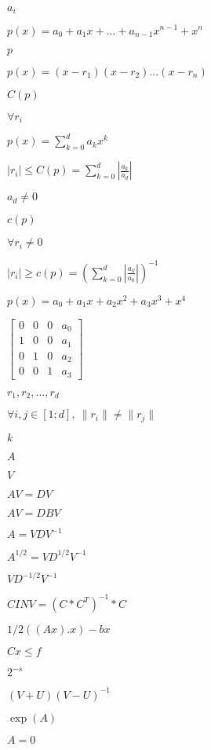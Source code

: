\documentclass{article}
\begin{document}
$ a_i $
\pagebreak

$ p(x) = a_0 + a_{1}x + ... + a_{n-1}x^{n-1} + x^n $
\pagebreak

$ p $
\pagebreak

$ p(x) = (x-r_1)(x-r_2)...(x-r_n) $
\pagebreak

$C(p)$
\pagebreak

$ \forall r_i $
\pagebreak

$ p(x) = \sum_{k=0}^d a_k x^k $
\pagebreak

$ |r_i| \le C(p) = \sum_{k=0}^{d} \left | \frac{a_k}{a_d} \right | $
\pagebreak

$a_d \neq 0$
\pagebreak

$c(p)$
\pagebreak

$ \forall r_i \neq 0 $
\pagebreak

$ |r_i| \ge c(p) = \left( \sum_{k=0}^{d} \left | \frac{a_k}{a_0} \right | \right)^{-1} $
\pagebreak

$ p(x) = a_0 + a_1 x + a_2 x^2 + a_{3} x^3 + x^4 $
\pagebreak

$ \left [ \begin{array}{cccc} 0 & 0 & 0 & a_0 \\ 1 & 0 & 0 & a_1 \\ 0 & 1 & 0 & a_2 \\ 0 & 0 & 1 & a_3 \end{array} \right ] $
\pagebreak

$r_1,r_2,...,r_d$
\pagebreak

$ \forall i,j \in [1;d],~ \| r_i \| \neq \| r_j \| $
\pagebreak

$ k $
\pagebreak

$ A $
\pagebreak

$ V $
\pagebreak

$ A V = D V $
\pagebreak

$ A V = D B V $
\pagebreak

$ A = V D V^{-1} $
\pagebreak

$ A^{1/2} = V D^{1/2} V^{-1} $
\pagebreak

$ V D^{-1/2} V^{-1} $
\pagebreak

$ CINV = (C * C^T)^{-1} * C $
\pagebreak

$ 1/2((Ax).x) - bx $
\pagebreak

$ Cx \le f $
\pagebreak

$ 2^{-s} $
\pagebreak

$ (V+U)(V-U)^{-1} $
\pagebreak

$ \exp(A) $
\pagebreak

$ A = 0 $
\pagebreak
\end{document}

